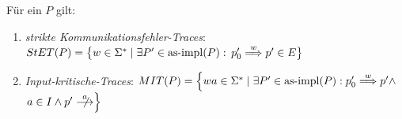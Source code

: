 \begin{Prop}
  Für ein \MEIO{} $P$ gilt:
  \begin{enumerate}
    \item \emph{strikte Kommunikationsfehler-Traces}: $StET (P) =
      \big\{w\in\Sigma ^* \mid \exists P' \in\mathrm{as}\text{-}\mathrm{impl} (P) :$ $p'_0 \weakmust[w]
      p' \in E\big\}$ 
    \item \emph{Input-kritische-Traces}: $\MIT (P) = \left\{wa\in\Sigma ^* \mid
      \exists P' \in\asimp (P) : p'_0 \weakmust[w] p' \land \right.$\linebreak
      $\left. a\in I\land p'\nmust[a] \right\}$ 
  \end{enumerate}
\end{Prop}
